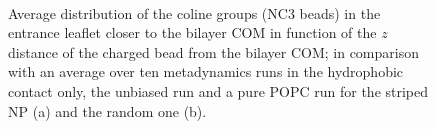 \begin{figure}[p]
	\center
	\\%
	\caption{Average distribution of the coline groups (NC3 beads) in the entrance leaflet closer to the bilayer \acs{COM} in function of the $z$ distance of the charged bead from the bilayer \acs{COM}; in comparison with an average over ten metadynamics runs in the hydrophobic contact only, the unbiased run and a pure \acs{POPC} run for the striped \acs{NP} (a) and the random one (b).}
\end{figure}

